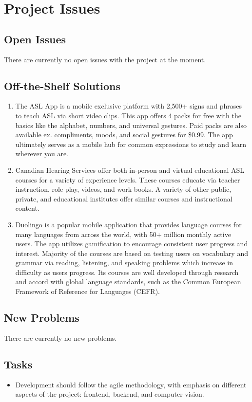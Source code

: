 \documentclass[12pt, titlepage]{article}
\begin{document}
\section{Project Issues}

\subsection{Open Issues}
There are currently no open issues with the project at the moment.

\subsection{Off-the-Shelf Solutions}
\begin{enumerate}
    \item The ASL App is a mobile exclusive platform with 2,500+ signs and phrases to teach ASL via short video clips. This app offers 4 packs for free with the basics like the alphabet, numbers, and universal gestures. Paid packs are also available ex. compliments, moods, and social gestures for \$0.99. The app ultimately serves as a mobile hub for common expressions to study and learn wherever you are.
    \item Canadian Hearing Services offer both in-person and virtual educational ASL courses for a variety of experience levels. These courses educate via teacher instruction, role play, videos, and work books. A variety of other public, private, and educational institutes offer similar courses and instructional content.
    \item Duolingo is a popular mobile application that provides language courses for many languages from across the world, with 50+ million monthly active users. The app utilizes gamification to encourage consistent user progress and interest. Majority of the courses are based on testing users on vocabulary and grammar via reading, listening, and speaking problems which increase in difficulty as users progress. Its courses are well developed through research and accord with global language standards, such as the Common European Framework of Reference for Languages (CEFR).
\end{enumerate}

\subsection{New Problems}
There are currently no new problems.

\subsection{Tasks}
\begin{itemize}
    \item Development should follow the agile methodology, with emphasis on different aspects of the project: frontend, backend, and computer vision.
\end{itemize}
\end{document}
